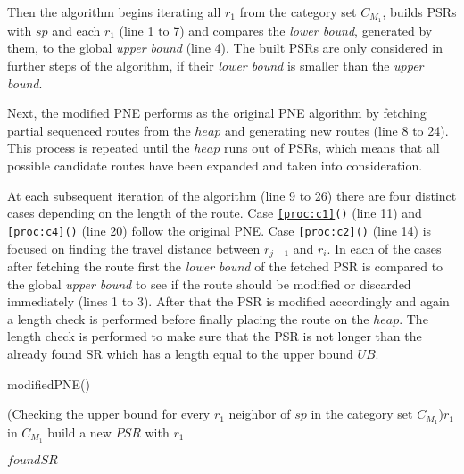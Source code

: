 Then the algorithm \texttt{} begins iterating all $r_1$ from the category set $C_{M_1}$, builds PSRs with $sp$ and each $r_1$ (line 1 to 7) and compares the \textit{lower bound}, generated by them, to the global \textit{upper bound} (line 4). The built PSRs are only considered in further steps of the algorithm, if their \textit{lower bound} is smaller than the \textit{upper bound}.

Next, the modified PNE performs as the original PNE algorithm by fetching partial sequenced routes from the $heap$ and generating new routes (line 8 to 24). This process is repeated until the $heap$ runs out of PSRs, which means that all possible candidate routes have been expanded and taken into consideration.

At each subsequent iteration of the algorithm \texttt{} (line 9 to 26) there are four distinct cases depending on the length of the route. Case \newline \texttt{\ref{proc:c1}()} (line 11) and \texttt{\ref{proc:c4}()} (line 20) follow the original PNE. Case \texttt{\ref{proc:c2}()} (line 14) is focused on finding the travel distance between $r_{j-1}$ and $r_i$. In each of the cases after fetching the route first the \textit{lower bound} of the fetched PSR is compared to the global \textit{upper bound} to see if the route should be modified or discarded immediately (lines 1 to 3). After that the PSR is modified accordingly and again a length check is performed before finally placing the route on the $heap$. The length check is performed to make sure that the PSR is not longer than the already found SR which has a length equal to the upper bound $UB$.  

\begin{algorithm}[htb!]
\caption{modifiedPNE()}
\label{alg:mPNE}
	
	\ForEach(Checking the upper bound for every $r_1$ neighbor of $sp$ in the category set $C_{M_1}$){$r_1$ in $C_{M_1}$}{
		build a new $PSR$ with $r_1$\;
	}
	
	
	\Return $foundSR$
	
\end{algorithm}

